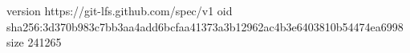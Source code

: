 version https://git-lfs.github.com/spec/v1
oid sha256:3d370b983c7bb3aa4add6bcfaa41373a3b12962ac4b3e6403810b54474ea6998
size 241265
